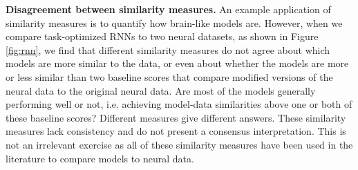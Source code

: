 \documentclass{article} %
\begin{document}


\textbf{Disagreement between similarity measures.}
An example application of similarity measures is to quantify how brain-like models are. However, when we compare task-optimized RNNs to two neural datasets, as shown in Figure \ref{fig:rnn}, we find that different similarity measures do not agree about which models are more similar to the data, or even about whether the models are more or less similar than two baseline scores that compare modified versions of the neural data to the original neural data.  Are most of the models generally performing well or not, i.e. achieving model-data similarities above one or both of these baseline scores? Different measures give different answers. These similarity measures lack consistency and do not present a consensus interpretation. This is not an irrelevant exercise as all of these similarity measures have been used in the literature to compare models to neural data.

\end{document}
